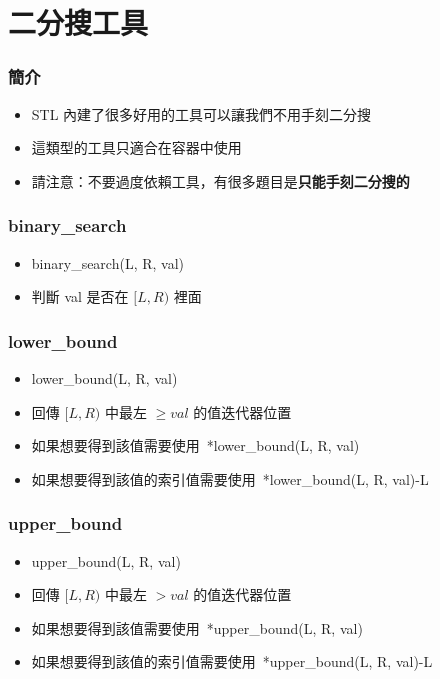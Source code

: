 \documentclass[mathserif]{beamer}
\begin{document}
\section{二分搜工具}

\begin{frame}
    \frametitle{簡介}
    \begin{itemize}
        \item STL 內建了很多好用的工具可以讓我們不用手刻二分搜
        \item 這類型的工具只適合在容器中使用
        \item 請注意：不要過度依賴工具，有很多題目是\textbf{只能手刻二分搜的}
    \end{itemize}
\end{frame}

\begin{frame}
    \frametitle{binary\_search}
    \begin{itemize}
        \item binary\_search({\color{red}L}, {\color{red}R}, {\color{red}val})
        \item 判斷 val 是否在 $[L, R)$ 裡面
    \end{itemize}
\end{frame}

\begin{frame}
    \frametitle{lower\_bound}
    \begin{itemize}
        \item lower\_bound({\color{red}L}, {\color{red}R}, {\color{red}val})
        \item 回傳 $[L, R)$ 中最左 $\geq val$ 的值迭代器位置
        \item<2-> 如果想要得到該值需要使用\ {\color{red}*}lower\_bound(L, R, val)
        \item<2-> 如果想要得到該值的索引值需要使用\ {\color{red}*}lower\_bound(L, R, val){\color{red}-L}
    \end{itemize}
\end{frame}

\begin{frame}
    \frametitle{upper\_bound}
    \begin{itemize}
        \item upper\_bound({\color{red}L}, {\color{red}R}, {\color{red}val})
        \item 回傳 $[L, R)$ 中最左 $> val$ 的值迭代器位置
        \item<2-> 如果想要得到該值需要使用\ {\color{red}*}upper\_bound(L, R, val)
        \item<2-> 如果想要得到該值的索引值需要使用\ {\color{red}*}upper\_bound(L, R, val){\color{red}-L}
    \end{itemize}
\end{frame}
\end{document}
